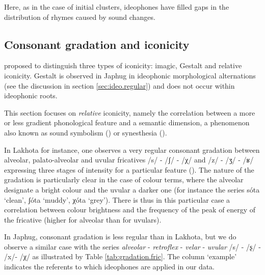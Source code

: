 \documentclass[oldfontcommands,oneside,a4paper,11pt]{article}
\newcommand{\ipa}[1]{{\phon \mbox{#1}}} %
\begin{document}
Here, as in the case of initial clusters, ideophones have filled gaps in the distribution of rhymes caused by sound changes.




\subsection{Consonant gradation and iconicity}
 \citet[47]{dingemanse11ezra} proposed to distinguish three types of iconicity: imagic, Gestalt and relative iconicity. Gestalt is   observed in Japhug in ideophonic morphological alternations (see the discussion in section \ref{sec:ideo.regular}) and does not occur within ideophonic roots. 
 
 This section focuses on \textit{relative} iconicity, namely the correlation between a more or less gradient phonological feature and a semantic dimension, a phenomenon also known as sound symbolism  (\citealt[16]{deloria41})  or synesthesia (\citealt[186-7]{gerner04expressives1}).


  In Lakhota for instance, one observes a very regular consonant gradation between alveolar, palato-alveolar and uvular fricatives /\ipa{s}/ - /\ipa{ʃ}/ - /\ipa{χ}/ and /\ipa{z}/ - /\ipa{ʒ}/ - /\ipa{ʁ}/ expressing three stages of intensity for a particular feature (\citealt[16-18]{deloria41}). The nature of the gradation is particularly clear in the case of colour terms, where the alveolar designate a bright colour and the uvular a darker one (for instance the series \ipa{sóta} `clean', \ipa{ʃóta} `muddy', \ipa{χóta} `grey'). There is thus in this particular case a correlation between colour brightness and   the frequency  of the peak of energy of the fricative (higher for alveolar than for uvulars).

In Japhug,  consonant gradation is less regular than in Lakhota, but we do observe a similar case with the  series \textit{alveolar} - \textit{retroflex} - \textit{velar} - \textit{uvular} /\ipa{s}/ - /\ipa{ʂ}/ - /\ipa{x}/- /\ipa{χ}/ as illustrated by Table \ref{tab:gradation.fric}. The column `example' indicates the referents to which   ideophones are applied in our data.
\end{document}
